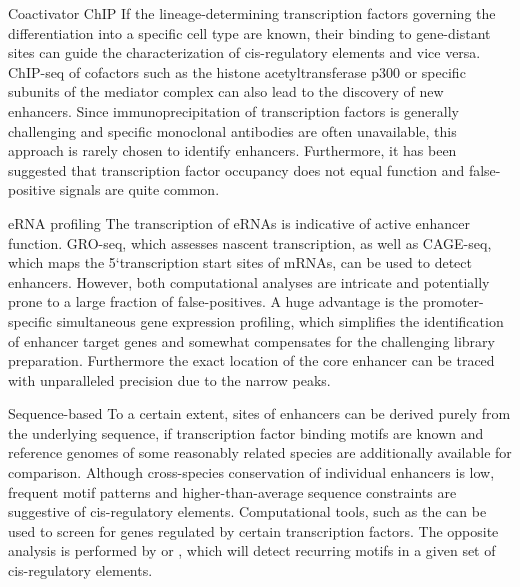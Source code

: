 \begin{mydescription}{0.5cm}
	\item[Coactivator ChIP] If the lineage-determining transcription factors governing the differentiation into a specific cell type are known, their binding to gene-distant sites can guide the characterization of cis-regulatory elements and vice versa\cite{Bornstein2014,Bertolino2016}. ChIP-seq of cofactors such as the histone acetyltransferase p300\cite{Visel2009} or specific subunits of the mediator complex\cite{Aranda-Orgilles2016} can also lead to the discovery of new enhancers. Since immunoprecipitation of transcription factors is generally challenging and specific monoclonal antibodies are often unavailable, this approach is rarely chosen to identify enhancers. Furthermore, it has been suggested that transcription factor occupancy does not equal function\cite{Lickwar2012} and false-positive signals are quite common\cite{Teytelman2013}. 
	\item[eRNA profiling] The transcription of eRNAs is indicative of active enhancer function. GRO-seq, which assesses nascent transcription\cite{Gatehouse1995,Core2008}, as well as CAGE-seq\cite{Carninci1996,Shiraki2003}, which maps the 5\lq transcription start sites of mRNAs, can be used to detect enhancers. However, both computational analyses are intricate and potentially prone to a large fraction of false-positives\cite{Andersson2014,Nagari2017}. A huge advantage is the promoter-specific simultaneous gene expression profiling\cite{Takahashi2012}, which simplifies the identification of enhancer target genes and somewhat compensates for the challenging library preparation. Furthermore the exact location of the core enhancer can be traced with unparalleled precision due to the narrow peaks. 
	\item[Sequence-based] To a certain extent, sites of enhancers can be derived purely from the underlying sequence, if transcription factor binding motifs are known and reference genomes of some reasonably related species are additionally available for comparison. Although cross-species conservation of individual enhancers is low\cite{Schmidt2010,Blow2010,Villar2015}, frequent motif patterns and higher-than-average sequence constraints are suggestive of cis-regulatory elements. Computational tools, such as the \cite{Hallikas2006} can be used to screen for genes regulated by certain transcription factors. The opposite analysis is performed by \cite{Fletez-Brant2013} or \cite{Heinz2010}, which will detect recurring motifs in a given set of cis-regulatory elements. 

\end{mydescription}
